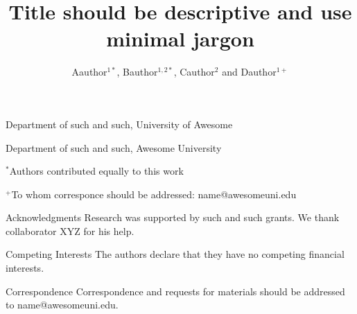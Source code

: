 \documentclass{nature}
\title{Title should be descriptive and use minimal jargon}
\author{Aauthor$^{1*}$, Bauthor$^{1,2*}$, Cauthor$^{2}$ and Dauthor$^{1+}$}
\begin{document}
\maketitle

\begin{affiliations}
 \item Department of such and such, University of Awesome
 \item Department of such and such, Awesome University
 \item[] $^{*}$Authors contributed equally to this work
 \item[] $^{+}$To whom corresponce should be addressed: name@awesomeuni.edu
\end{affiliations}


\beginbodyfigures







\setlength{\parskip}{12pt}%





\begin{addendum}
 \item [Acknowledgments] Research was supported by such and such grants. We thank collaborator XYZ for his help.
 \item[Competing Interests] The authors declare that they have no competing financial interests.
 \item[Correspondence] Correspondence and requests for materials should be addressed to name@awesomeuni.edu.
\end{addendum}


\beginedfigures


\end{document}
